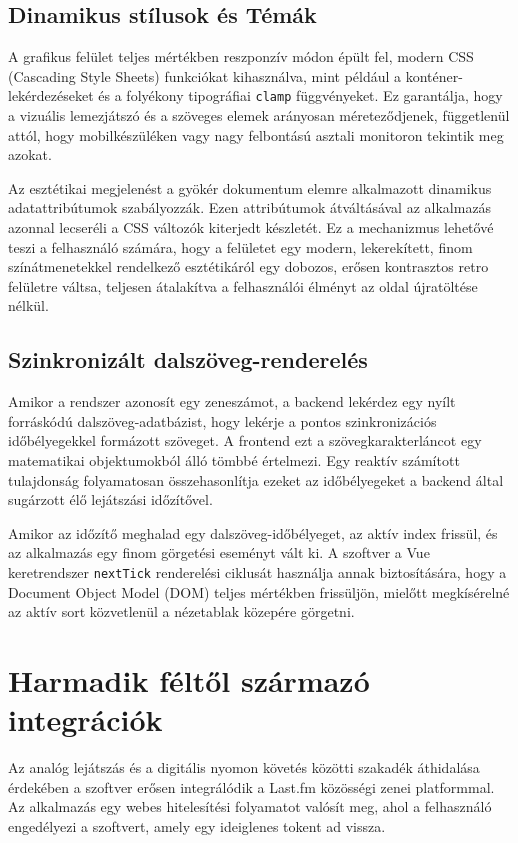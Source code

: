 \documentclass[12pt,a4paper,hungarian]{report}
\begin{document}
\subsection{Dinamikus stílusok és Témák}
A grafikus felület teljes mértékben reszponzív módon épült fel, modern CSS (Cascading Style Sheets) funkciókat kihasználva, mint például a konténer-lekérdezéseket és a folyékony tipográfiai \texttt{clamp} függvényeket. Ez garantálja, hogy a vizuális lemezjátszó és a szöveges elemek arányosan méreteződjenek, függetlenül attól, hogy mobilkészüléken vagy nagy felbontású asztali monitoron tekintik meg azokat.

Az esztétikai megjelenést a gyökér dokumentum elemre alkalmazott dinamikus adatattribútumok szabályozzák. Ezen attribútumok átváltásával az alkalmazás azonnal lecseréli a CSS változók kiterjedt készletét. Ez a mechanizmus lehetővé teszi a felhasználó számára, hogy a felületet egy modern, lekerekített, finom színátmenetekkel rendelkező esztétikáról egy dobozos, erősen kontrasztos retro felületre váltsa, teljesen átalakítva a felhasználói élményt az oldal újratöltése nélkül.

\subsection{Szinkronizált dalszöveg-renderelés}

Amikor a rendszer azonosít egy zeneszámot, a backend lekérdez egy nyílt forráskódú dalszöveg-adatbázist, hogy lekérje a pontos szinkronizációs időbélyegekkel formázott szöveget. A frontend ezt a szövegkarakterláncot egy matematikai objektumokból álló tömbbé értelmezi. Egy reaktív számított tulajdonság folyamatosan összehasonlítja ezeket az időbélyegeket a backend által sugárzott élő lejátszási időzítővel. 

Amikor az időzítő meghalad egy dalszöveg-időbélyeget, az aktív index frissül, és az alkalmazás egy finom görgetési eseményt vált ki. A szoftver a Vue keretrendszer \texttt{nextTick} renderelési ciklusát használja annak biztosítására, hogy a Document Object Model (DOM) teljes mértékben frissüljön, mielőtt megkísérelné az aktív sort közvetlenül a nézetablak közepére görgetni.

\section{Harmadik féltől származó integrációk}

Az analóg lejátszás és a digitális nyomon követés közötti szakadék áthidalása érdekében a szoftver erősen integrálódik a Last.fm közösségi zenei platformmal. Az alkalmazás egy webes hitelesítési folyamatot valósít meg, ahol a felhasználó engedélyezi a szoftvert, amely egy ideiglenes tokent ad vissza.
\end{document}
